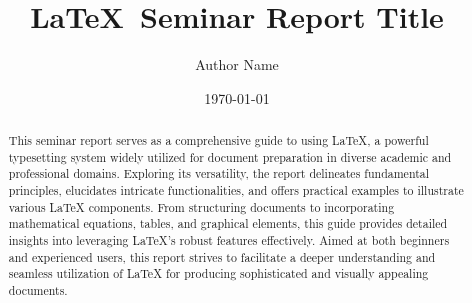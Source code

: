 \documentclass[progress]{csreport} %
\title{\LaTeX\ Seminar Report Title} %
\author{Author Name}%
\date{\today}
\begin{document}
\pagestyle{plain} %
\maketitle

\declarationByGuide
\declarationByStudent

\startpreamble

\newpage


\begin{abstract}
	This seminar report serves as a comprehensive guide to using LaTeX, a powerful typesetting system widely utilized for document preparation in diverse academic and professional domains. Exploring its versatility, the report delineates fundamental principles, elucidates intricate functionalities, and offers practical examples to illustrate various LaTeX components. From structuring documents to incorporating mathematical equations, tables, and graphical elements, this guide provides detailed insights into leveraging LaTeX's robust features effectively. Aimed at both beginners and experienced users, this report strives to facilitate a deeper understanding and seamless utilization of LaTeX for producing sophisticated and visually appealing documents.
\end{abstract}


\tableofcontents %


\pagebreak








\end{document}
